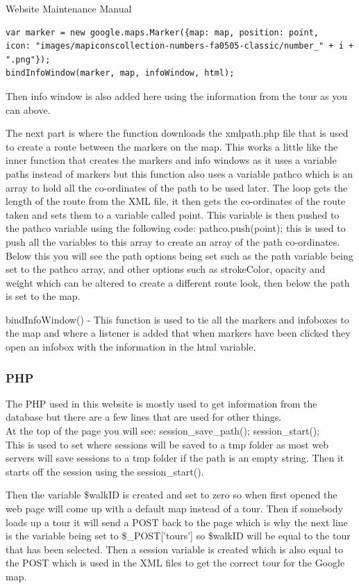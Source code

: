 \documentclass{article}
\begin{document}
\begin{section}{Website Maintenance Manual}
\begin{verbatim}
var marker = new google.maps.Marker({map: map, position: point,
icon: "images/mapiconscollection-numbers-fa0505-classic/number_" + i + ".png"});
bindInfoWindow(marker, map, infoWindow, html);
\end{verbatim}

Then info window is also added here using the information from the tour as you can above.

		The next part is where the function downloads the xmlpath.php file that is used to create a route between the markers on the map. This works a little like the inner function that creates the markers and info windows as it uses a variable paths instead of markers but this function also uses a variable pathco which is an array to hold all the co-ordinates of the path to be used later. The loop gets the length of the route from the XML file, it then gets the co-ordinates of the route taken and sets them to a variable called point. This variable is then pushed to the pathco variable using the following code:    pathco.push(point);    this is used to push all the variables to this array to create an array of the path co-ordinates. Below this you will see the path options being set such as the path variable being set to the pathco array, and other options such as strokeColor, opacity and weight which can be altered to create a different route look, then below the path is set to the map.

bindInfoWindow() -  This function is used to tie all the markers and infoboxes to the map and where a listener is added that when markers have been clicked  they open an infobox with the information in the html variable.

		\subsubsection{PHP}
		The PHP used in this website is mostly used to get information from the database but there are a few lines that are used for other things. \\

		At the top of the page you will see: session\_save\_path(); session\_start(); \\
This is used to set where sessions will be saved to a tmp folder as most web servers will save sessions to a tmp folder if the path is an empty string. Then it starts off the session using the session\_start().

		Then the variable \$walkID is created and set to zero so when first opened the web page will come up with a default map instead of a tour. Then if somebody loads up a tour it will send a POST back to the page which is why the next line is the variable being set to \$\_POST['tours'] so \$walkID will be equal to the tour that has been selected. Then a session variable is created which is also equal to the POST which is used in the XML files to get the correct tour for the Google map. \\


\end{section}
\end{document}
